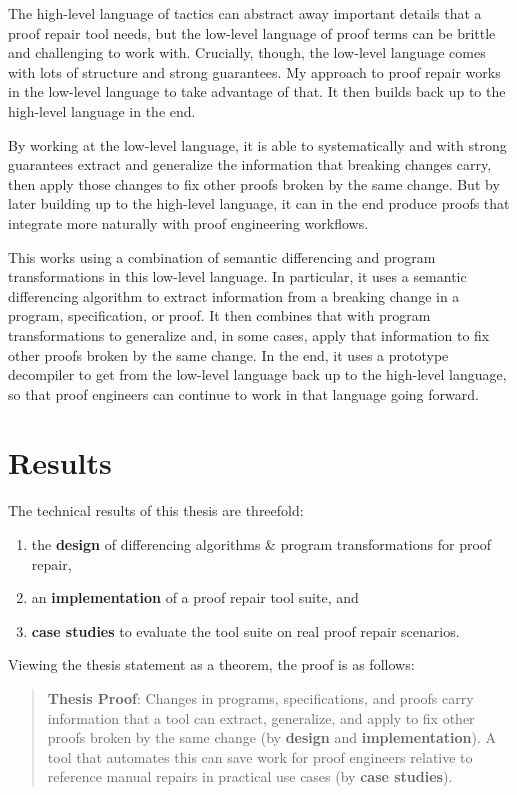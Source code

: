The high-level language of tactics can abstract away important details that a proof repair tool needs,
but the low-level language of proof terms can be brittle and challenging to work with.
Crucially, though, the low-level language comes with lots of structure and strong guarantees.
My approach to proof repair works in the low-level language to take advantage of that.
It then builds back up to the high-level language in the end.

By working at the low-level language, it is able to systematically and with strong guarantees extract and generalize the 
information that breaking changes carry,
then apply those changes to fix other proofs broken by the same change.
But by later building up to the high-level language,
it can in the end produce proofs that integrate more naturally with proof engineering workflows.

This works using a combination of semantic differencing and program transformations in this low-level language.
In particular, it uses a semantic differencing algorithm to extract information from a breaking change in a program, specification, or proof.
It then combines that with program transformations to generalize and, in some cases, apply that information to fix other 
proofs broken by the same change.
In the end, it uses a prototype decompiler to get from the low-level language back up to the high-level language,
so that proof engineers can continue to work in that language going forward. %

\section{Results}

The technical results of this thesis are threefold:

\begin{enumerate}
\item the \textbf{design} of differencing algorithms \& program transformations for proof repair, 
\item an \textbf{implementation} of a proof repair tool suite, and
\item \textbf{case studies} to evaluate the tool suite on real proof repair scenarios.
\end{enumerate}
Viewing the thesis statement as a theorem, the proof is as follows: %

\begin{quote}
\textbf{Thesis Proof}: Changes in programs, specifications, and proofs carry information that a tool can extract, generalize, and apply to fix other proofs broken by the same change (by \textbf{design} and \textbf{implementation}). A tool that automates this can save work for proof engineers relative to reference manual repairs in practical use cases (by \textbf{case studies}).
\end{quote}

